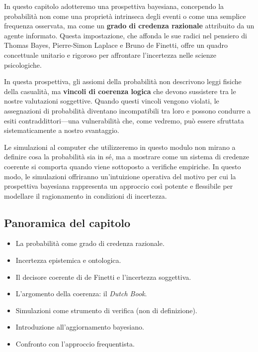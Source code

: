 \documentclass[
  letterpaper,
  DIV=11,
  numbers=noendperiod,
  oneside]{scrreprt}
\providecommand{\tightlist}{%
  \setlength{\itemsep}{0pt}\setlength{\parskip}{0pt}}
\theoremstyle{definition}
\theoremstyle{plain}
\theoremstyle{definition}
\theoremstyle{remark}
\begin{document}
In questo capitolo adotteremo una prospettiva bayesiana, concependo la
probabilità non come una proprietà intrinseca degli eventi o come una
semplice frequenza osservata, ma come un \textbf{grado di credenza
razionale} attribuito da un agente informato. Questa impostazione, che
affonda le sue radici nel pensiero di Thomas Bayes, Pierre-Simon Laplace
e Bruno de Finetti, offre un quadro concettuale unitario e rigoroso per
affrontare l'incertezza nelle scienze psicologiche.

In questa prospettiva, gli assiomi della probabilità non descrivono
leggi fisiche della casualità, ma \textbf{vincoli di coerenza logica}
che devono sussistere tra le nostre valutazioni soggettive. Quando
questi vincoli vengono violati, le assegnazioni di probabilità diventano
incompatibili tra loro e possono condurre a esiti contraddittori---una
vulnerabilità che, come vedremo, può essere sfruttata sistematicamente a
nostro svantaggio.

Le simulazioni al computer che utilizzeremo in questo modulo non mirano
a definire cosa la probabilità sia in sé, ma a mostrare come un sistema
di credenze coerente si comporta quando viene sottoposto a verifiche
empiriche. In questo modo, le simulazioni offriranno un'intuizione
operativa del motivo per cui la prospettiva bayesiana rappresenta un
approccio così potente e flessibile per modellare il ragionamento in
condizioni di incertezza.

\subsection*{Panoramica del capitolo}\label{panoramica-del-capitolo}

\begin{itemize}
\tightlist
\item
  La probabilità come grado di credenza razionale.
\item
  Incertezza epistemica e ontologica.
\item
  Il decisore coerente di de Finetti e l'incertezza soggettiva.
\item
  L'argomento della coerenza: il \emph{Dutch Book}.
\item
  Simulazioni come strumento di verifica (non di definizione).
\item
  Introduzione all'aggiornamento bayesiano.
\item
  Confronto con l'approccio frequentista.
\end{itemize}
\end{document}
